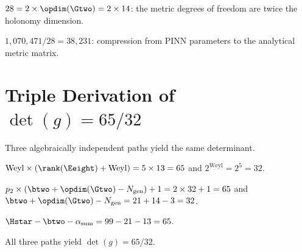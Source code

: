 \begin{theorem}[SPD$_7$ = Twice Holonomy]\label{thm:spd7_twice_G2}
    \leanok
    $28 = 2 \times \opdim(\Gtwo) = 2 \times 14$: the metric degrees of freedom
    are twice the holonomy dimension.
\end{theorem}

\begin{theorem}\label{thm:compression}
    \leanok
    $1{,}070{,}471 / 28 = 38{,}231$: compression from PINN parameters
    to the analytical metric matrix.
\end{theorem}

\section{Triple Derivation of \texorpdfstring{$\det(g) = 65/32$}{det(g) = 65/32}}

Three algebraically independent paths yield the same determinant.

\begin{theorem}\label{thm:detg_weyl}
    \leanok
    $\mathrm{Weyl} \times (\rank(\Eeight) + \mathrm{Weyl}) = 5 \times 13 = 65$
    and $2^{\mathrm{Weyl}} = 2^5 = 32$.
\end{theorem}

\begin{theorem}\label{thm:detg_cohom}
    \leanok
    $p_2 \times (\btwo + \opdim(\Gtwo) - N_{\mathrm{gen}}) + 1 = 2 \times 32 + 1 = 65$
    and $\btwo + \opdim(\Gtwo) - N_{\mathrm{gen}} = 21 + 14 - 3 = 32$.
\end{theorem}

\begin{theorem}\label{thm:detg_Hstar}
    \leanok
    $\Hstar - \btwo - \alpha_{\mathrm{sum}} = 99 - 21 - 13 = 65$.
\end{theorem}

\begin{theorem}\label{thm:detg_triple}
    \leanok
    All three paths yield $\det(g) = 65/32$.
\end{theorem}

